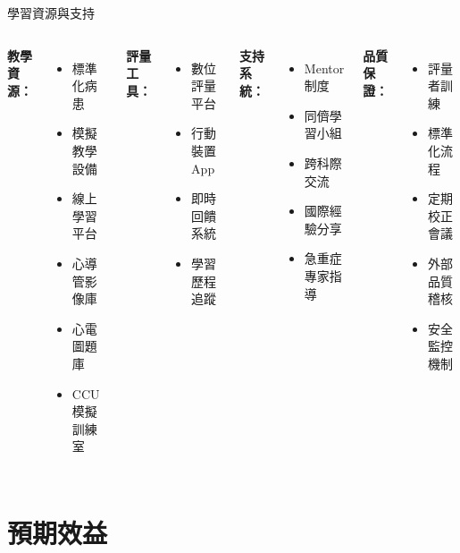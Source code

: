 \documentclass[aspectratio=169]{beamer}
\begin{document}
\begin{frame}{學習資源與支持}
\begin{columns}[c]
\textbf{教學資源：}
\begin{itemize}
\item 標準化病患
\item 模擬教學設備
\item 線上學習平台
\item 心導管影像庫
\item 心電圖題庫
\item \textcolor{emergency_red}{CCU模擬訓練室}
\end{itemize}

\textbf{評量工具：}
\begin{itemize}
\item 數位評量平台
\item 行動裝置App
\item 即時回饋系統
\item 學習歷程追蹤
\end{itemize}

\textbf{支持系統：}
\begin{itemize}
\item Mentor制度
\item 同儕學習小組
\item 跨科際交流
\item 國際經驗分享
\item \textcolor{emergency_red}{急重症專家指導}
\end{itemize}

\textbf{品質保證：}
\begin{itemize}
\item 評量者訓練
\item 標準化流程
\item 定期校正會議
\item 外部品質稽核
\item \textcolor{emergency_red}{安全監控機制}
\end{itemize}
\end{columns}
\end{frame}

\section{預期效益}
\end{document}
